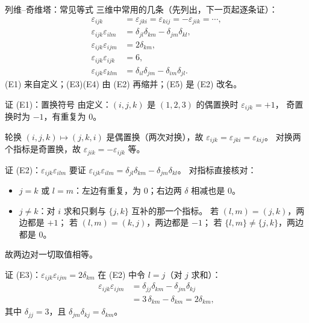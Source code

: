 \documentclass[fontset=windows, chinese, 10pt, xcolor=dvipsnames]{beamer}
\begin{document}
\begin{frame}{列维--奇维塔：常见等式}
  \footnotesize
  三维中常用的几条（先列出，下一页起逐条证）：
  \begin{align}
    \varepsilon_{ijk}
    &=\varepsilon_{jki}=\varepsilon_{kij}
    =-\varepsilon_{jik}=\cdots,
    \tag{E1}\\[0.2em]
    \varepsilon_{ijk}\varepsilon_{ilm}
    &=\delta_{jl}\delta_{km}-\delta_{jm}\delta_{kl},
    \tag{E2}\\[0.2em]
    \varepsilon_{ijk}\varepsilon_{ijm}
    &=2\delta_{km},
    \tag{E3}\\[0.2em]
    \varepsilon_{ijk}\varepsilon_{ijk}
    &=6,
    \tag{E4}\\[0.2em]
    \varepsilon_{ijk}\varepsilon_{klm}
    &=\delta_{il}\delta_{jm}-\delta_{im}\delta_{jl}.
    \tag{E5}
  \end{align}
  (E1) 来自定义；(E3)(E4) 由 (E2) 再缩并；(E5) 是 (E2) 改名。
\end{frame}

\begin{frame}{证 (E1)：置换符号}
  由定义：$(i,j,k)$ 是 $(1,2,3)$ 的偶置换时 $\varepsilon_{ijk}=+1$，
  奇置换时为 $-1$，有重复为 $0$。

  轮换 $(i,j,k)\mapsto(j,k,i)$ 是偶置换（两次对换），故
  $\varepsilon_{ijk}=\varepsilon_{jki}=\varepsilon_{kij}$。
  对换两个指标是奇置换，故
  $\varepsilon_{jik}=-\varepsilon_{ijk}$ 等。
\end{frame}

\begin{frame}{证 (E2)：$\varepsilon_{ijk}\varepsilon_{ilm}$}
  \footnotesize
  要证
  $\varepsilon_{ijk}\varepsilon_{ilm}
  =\delta_{jl}\delta_{km}-\delta_{jm}\delta_{kl}$。
  对指标直接核对：
  \begin{itemize}
    \item $j=k$ 或 $l=m$：左边有重复，为 $0$；右边两 $\delta$ 相减也是 $0$。
    \item $j\neq k$：对 $i$ 求和只剩与 $\{j,k\}$ 互补的那一个指标。
      若 $(l,m)=(j,k)$，两边都是 $+1$；
      若 $(l,m)=(k,j)$，两边都是 $-1$；
      若 $\{l,m\}\neq\{j,k\}$，两边都是 $0$。
  \end{itemize}
  故两边对一切取值相等。
\end{frame}

\begin{frame}{证 (E3)：$\varepsilon_{ijk}\varepsilon_{ijm}=2\delta_{km}$}
  在 (E2) 中令 $l=j$（对 $j$ 求和）：
  \begin{align*}
    \varepsilon_{ijk}\varepsilon_{ijm}
    &=\delta_{jj}\delta_{km}-\delta_{jm}\delta_{kj} \\
    &=3\,\delta_{km}-\delta_{km}
    =2\delta_{km},
  \end{align*}
  其中 $\delta_{jj}=3$，且 $\delta_{jm}\delta_{kj}=\delta_{km}$。
\end{frame}
\end{document}
